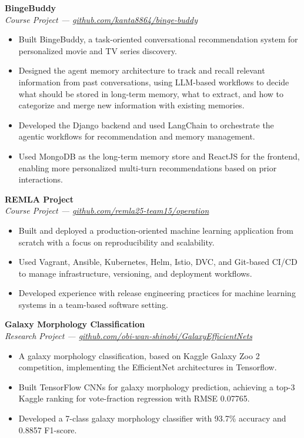 \documentclass[10pt,a4paper]{article}
\newcommand{\resumeheading}[4]{%
  \textbf{#1} \hfill #2\\[-0.15em]
  \textit{#3} \hfill \textit{#4}\\[-1.5em]
}
\begin{document}
\resumeheading
{BingeBuddy}
{}
{Course Project --- \href{https://github.com/kanta8864/binge-buddy}{github.com/kanta8864/binge-buddy}}
{}
\begin{itemize}
	\item Built BingeBuddy, a task-oriented conversational recommendation system for personalized movie and TV series discovery.
	\item Designed the agent memory architecture to track and recall relevant information from past conversations, using LLM-based workflows to decide what should be stored in long-term memory, what to extract, and how to categorize and merge new information with existing memories.
	\item Developed the Django backend and used LangChain to orchestrate the agentic workflows for recommendation and memory management.
	\item Used MongoDB as the long-term memory store and ReactJS for the frontend, enabling more personalized multi-turn recommendations based on prior interactions.
\end{itemize}

\resumeheading
{REMLA Project}
{}
{Course Project --- \href{https://github.com/remla25-team15/operation}{github.com/remla25-team15/operation}}
{}
\begin{itemize}
	\item Built and deployed a production-oriented machine learning application from scratch with a focus on reproducibility and scalability.
	\item Used Vagrant, Ansible, Kubernetes, Helm, Istio, DVC, and Git-based CI/CD to manage infrastructure, versioning, and deployment workflows.
	\item Developed experience with release engineering practices for machine learning systems in a team-based software setting.
\end{itemize}

\resumeheading
{Galaxy Morphology Classification}
{}
{Research Project --- \href{https://github.com/obi-wan-shinobi/GalaxyEfficientNets}{github.com/obi-wan-shinobi/GalaxyEfficientNets}}
{}
\begin{itemize}
	\item A galaxy morphology classification, based on Kaggle Galaxy Zoo 2 competition, implementing the EﬃcientNet architectures in Tensorflow.
	\item Built TensorFlow CNNs for galaxy morphology prediction, achieving a top-3 Kaggle ranking for vote-fraction regression with RMSE 0.07765.
	\item Developed a 7-class galaxy morphology classifier with 93.7\% accuracy and 0.8857 F1-score.
\end{itemize}
\end{document}
